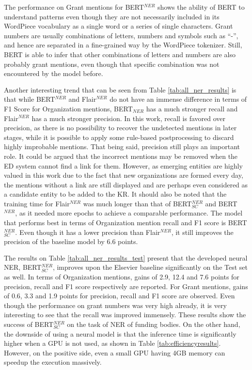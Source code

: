 \documentclass{report}
\theoremstyle{definition}
\theoremstyle{remark}
\begin{document}
The performance on Grant mentions for BERT$^{NER}$ shows the ability of BERT to understand patterns even though they are not necessarily included in its WordPiece vocabulary as a single word or a series of single characters. Grant numbers are usually combinations of letters, numbers and symbols such as ``-'', and hence are separated in a fine-grained way by the WordPiece tokenizer.  Still, BERT is able to infer that other combinations of letters and numbers are also probably grant mentions, even though that specific combination was not encountered by the model before.

Another interesting trend that can be seen from Table \ref{tab:all_ner_results} is that while BERT$^{NER}$ and Flair$^{NER}$ do not have an immense difference in terms of F1 Score for Organization mentions, BERT$_{NER}$ has a much stronger recall and Flair$^{NER}$ has a much stronger precision. In this work, recall is favored over precision, as there is no possibility to recover the undetected mentions in later stages, while it is possible to apply some rule-based postprocessing to discard highly improbable mentions. That being said, precision still plays an important role. It could be argued that the incorrect mentions may be removed when the ED system cannot find a link for them. However, as emerging entities are highly valued in this work due to the fact that new organizations are formed every day, the mentions without a link are still displayed and are perhaps even considered as a candidate entity to be added to the KR. It should also be noted that the training time for Flair$^{NER}$ was much longer than that of BERT$^{NER}_{SC}$ and BERT$^{NER}$, as it needed more epochs to achieve a comparable performance. The model that performs best in terms of Organization mention recall and F1 score is BERT$^{NER}_{SC}$. Even though it has a lower precision than Flair$^{NER}$, it still improves the precision of the baseline model by 6.6 points.   

The results on Table \ref{tab:all_ner_results_test} present that the developed neural NER, BERT$_{SC}^{NER}$, improves upon the Elsevier baseline significantly on the Test set as well. In terms of Organization mentions, gains of 2.9, 12.4 and 7.6 points for precision, recall and F1 score respectively are reported. For Grant mentions, gains of 0.6, 3.3 and 1.9 points for precision, recall and F1 score are observed. Even though the performance on grant numbers was very high already, it is very interesting to see that the recall was improved immensely. These results show the success of BERT$^{NER}_{SC}$ on the task of NER of funding bodies. On the other hand, the downside of using a neural model is that the inference time is significantly higher when a GPU is not used, as shown in Table \ref{tab:efficiencyresults}. However, on the positive side, even a small GPU having 4GB memory can speedup the execution massively.
\end{document}
